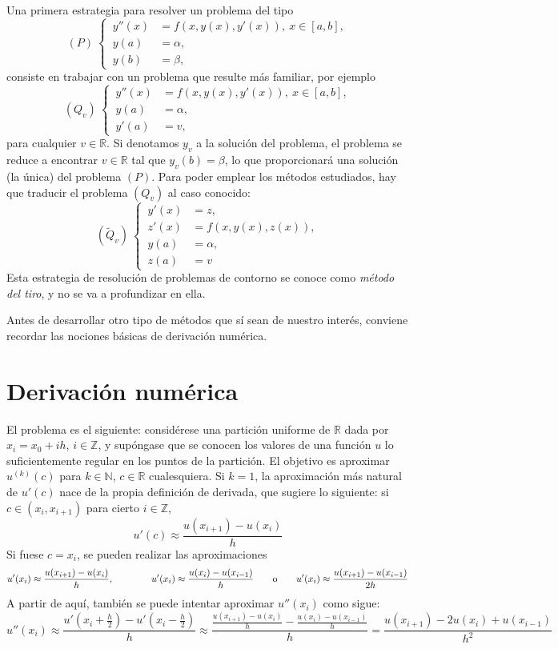\documentclass[11pt]{report}
\theoremstyle{mytheorem}
\theoremstyle{mydefinition}
\theoremstyle{myexample}
\newcommand{\R}{\mathbb R}
\newcommand{\N}{\mathbb N}
\newcommand{\Z}{\mathbb Z}
\begin{document}
Una primera estrategia para resolver un problema del tipo
\[(P) \ \left\{
\begin{alignedat}{1}
\, y''(x)  &= f(x,y(x), y'(x)), \ x \in [a,b], \\
\, y(a) &= \alpha, \\
\, y(b) &= \beta,
\end{alignedat}\right.\]
consiste en trabajar con un problema que resulte más familiar, por ejemplo
\[(Q_v) \ \left\{
\begin{alignedat}{1}
\, y''(x)  &= f(x,y(x), y'(x)), \ x \in [a,b], \\
\, y(a) &= \alpha, \\
\, y'(a) &= v,
\end{alignedat}\right.\]
para cualquier $v \in \R$. Si denotamos $y_v$ a la solución del problema, el problema se reduce a encontrar $v \in \R$ tal que $y_v(b) =\beta$, lo que proporcionará una solución (la única) del problema $(P)$. Para poder emplear los métodos estudiados, hay que traducir el problema $(Q_v)$ al caso conocido:
\[(\widetilde{Q}_v) \ \left\{
\begin{alignedat}{1}
\, y'(x)&=z, \\
\, z'(x)&=f(x,y(x),z(x)), \\
\, y(a) &= \alpha, \\
\, z(a) &= v
\end{alignedat}\right.\]
Esta estrategia de resolución de problemas de contorno se conoce como \emph{método del tiro}, y no se va a profundizar en ella. 

Antes de desarrollar otro tipo de métodos que sí sean de nuestro interés, conviene recordar las nociones básicas de derivación numérica.

\section{Derivación numérica}

El problema es el siguiente: considérese una partición uniforme de $\R$ dada por $x_i = x_0+ih$, $i \in \Z$, y supóngase que se conocen los valores de una función $u$ lo suficientemente regular en los puntos de la partición. El objetivo es aproximar $u^{(k)}(c)$ para $k \in \N$, $c \in \R$ cualesquiera. Si $k =1$, la aproximación más natural de $u'(c)$ nace de la propia definición de derivada, que sugiere lo siguiente: si $c \in (x_i,x_{i+1})$ para cierto $i \in \Z$,
\[u'(c) \approx \frac{u(x_{i+1})-u(x_i)}{h}\] 
Si fuese $c=x_i$, se pueden realizar las aproximaciones
\[u'(x_i) \approx \frac{u(x_{i+1})-u(x_i)}{h}, \qquad \qquad u'(x_i) \approx \frac{u(x_{i})-u(x_{i-1})}{h} \qquad \textup{o} \qquad u'(x_i) \approx \frac{u(x_{i+1})-u(x_{i-1})}{2h} \]
A partir de aquí, también se puede intentar aproximar $u''(x_i)$ como sigue:
\[u''(x_i) \approx \frac{u'(x_i+\frac{h}{2})-u'(x_i-\frac{h}{2})}{h} \approx \frac{\frac{u(x_{i+1})-u(x_i)}{h} - \frac{u(x_i)- u(x_{i-1})}{h}}{h} = \frac{u(x_{i+1})-2u(x_i)+u(x_{i-1})}{h^2}\]
\end{document}
